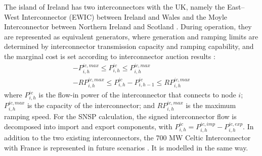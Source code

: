 \documentclass[sn-mathphys,Numbered]{sn-jnl}%
\theoremstyle{plain}%
\theoremstyle{definition}%
\theoremstyle{remark}%
\begin{document}
The island of Ireland has two interconnectors with the UK, namely the East--West Interconnector (EWIC) between Ireland and Wales and the Moyle Interconnector between Northern Ireland and Scotland \cite{RealTimeSystemInformation}. During operation, they are represented as equivalent generators, where generation and ramping limits are determined by interconnector transmission capacity and ramping capability, and the marginal cost is set according to interconnector auction results \cite{InterconnectorRequirement}:
\begin{gather}
    - P^{ic,max}_{i,h} \leq P^{ic}_{i,h} \leq P^{ic,max}_{i,h}
\label{eq interconnector capacity}\\
    - RP^{ic,max}_{i,h} \leq P^{ic}_{i,h} - P^{ic}_{i,h-1} \leq RP^{ic,max}_{i,h}
\label{eq interconnector ramp}
\end{gather}
where $P^{ic}_{i,h}$ is the flow-in power of the interconnector that connects to node $i$; $P^{ic,max}_{i,h}$ is the capacity of the interconnector; and $RP^{ic,max}_{i,h}$ is the maximum ramping speed. For the SNSP calculation, the signed interconnector flow is decomposed into import and export components, with $P^{ic}_{i,h}=P_{i,h}^{ic,imp}-P_{i,h}^{ic,exp}$.
In addition to the two existing interconnectors, the 700 MW Celtic Interconnector with France is represented in future scenarios \cite{CelticInterconnector}. It is modelled in the same way.
\end{document}
